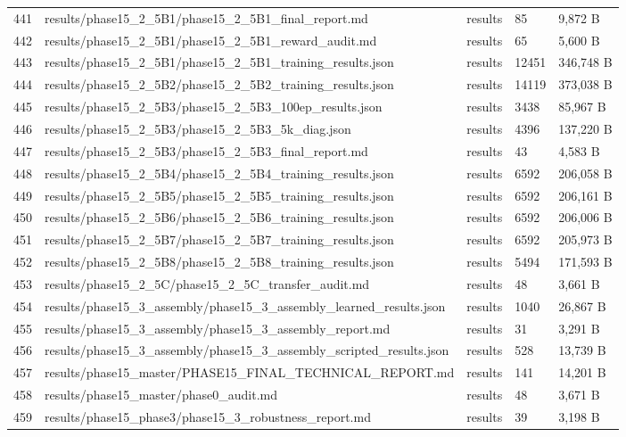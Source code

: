 \documentclass[11pt,a4paper,oneside]{book}
\begin{document}
\begin{longtable}{l l l l l}
441 & results/phase15\_2\_5B1/phase15\_2\_5B1\_final\_report.md & results & 85 & 9,872 B \\
442 & results/phase15\_2\_5B1/phase15\_2\_5B1\_reward\_audit.md & results & 65 & 5,600 B \\
443 & results/phase15\_2\_5B1/phase15\_2\_5B1\_training\_results.json & results & 12451 & 346,748 B \\
444 & results/phase15\_2\_5B2/phase15\_2\_5B2\_training\_results.json & results & 14119 & 373,038 B \\
445 & results/phase15\_2\_5B3/phase15\_2\_5B3\_100ep\_results.json & results & 3438 & 85,967 B \\
446 & results/phase15\_2\_5B3/phase15\_2\_5B3\_5k\_diag.json & results & 4396 & 137,220 B \\
447 & results/phase15\_2\_5B3/phase15\_2\_5B3\_final\_report.md & results & 43 & 4,583 B \\
448 & results/phase15\_2\_5B4/phase15\_2\_5B4\_training\_results.json & results & 6592 & 206,058 B \\
449 & results/phase15\_2\_5B5/phase15\_2\_5B5\_training\_results.json & results & 6592 & 206,161 B \\
450 & results/phase15\_2\_5B6/phase15\_2\_5B6\_training\_results.json & results & 6592 & 206,006 B \\
451 & results/phase15\_2\_5B7/phase15\_2\_5B7\_training\_results.json & results & 6592 & 205,973 B \\
452 & results/phase15\_2\_5B8/phase15\_2\_5B8\_training\_results.json & results & 5494 & 171,593 B \\
453 & results/phase15\_2\_5C/phase15\_2\_5C\_transfer\_audit.md & results & 48 & 3,661 B \\
454 & results/phase15\_3\_assembly/phase15\_3\_assembly\_learned\_results.json & results & 1040 & 26,867 B \\
455 & results/phase15\_3\_assembly/phase15\_3\_assembly\_report.md & results & 31 & 3,291 B \\
456 & results/phase15\_3\_assembly/phase15\_3\_assembly\_scripted\_results.json & results & 528 & 13,739 B \\
457 & results/phase15\_master/PHASE15\_FINAL\_TECHNICAL\_REPORT.md & results & 141 & 14,201 B \\
458 & results/phase15\_master/phase0\_audit.md & results & 48 & 3,671 B \\
459 & results/phase15\_phase3/phase15\_3\_robustness\_report.md & results & 39 & 3,198 B \\

\end{longtable}
\end{document}
